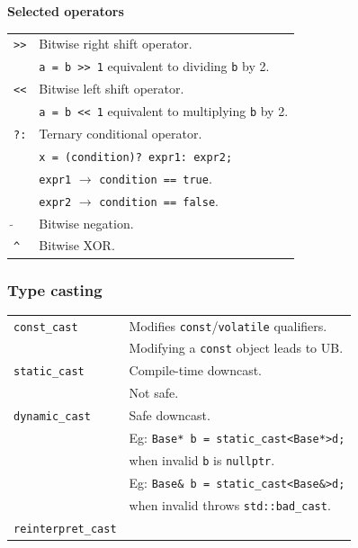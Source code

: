     \textbf{Selected operators}\\
    \begin{tabularx}{\linewidth}{lX}
        \texttt{>>}             & Bitwise right shift operator.\\
                                & \texttt{a = b >> 1} equivalent to dividing \texttt{b} by 2.\\
        \texttt{<<}             & Bitwise left shift operator.\\
                                & \texttt{a = b << 1} equivalent to multiplying \texttt{b} by 2.\\
        \texttt{?:}             & Ternary conditional operator.\\
                                & \texttt{x = (condition)? expr1: expr2;}\\
                                & \texttt{expr1} $\to$ \texttt{condition == true}.\\
                                & \texttt{expr2} $\to$ \texttt{condition == false}.\\
        \texttt{$\tilde{}$}     & Bitwise negation.\\
        \texttt{\^}             & Bitwise XOR.\\
    \end{tabularx}


\subsubsection{Type casting}

    \begin{tabularx}{\linewidth}{lX}
        \texttt{const\_cast}            & Modifies \texttt{const}/\texttt{volatile} qualifiers.\\
                                        & Modifying a \texttt{const} object leads to UB.\\
        \texttt{static\_cast}           & Compile-time downcast.\\
                                        & Not safe.\\
        \texttt{dynamic\_cast}          & Safe downcast.\\
                                        & Eg: \texttt{Base* b = static\_cast<Base*>d;} \\
                                        & when invalid \texttt{b} is \texttt{nullptr}.\\
                                        & Eg: \texttt{Base\& b = static\_cast<Base\&>d;} \\
                                        & when invalid throws \texttt{std::bad\_cast}.\\
        \texttt{reinterpret\_cast}      & \\
    \end{tabularx}

